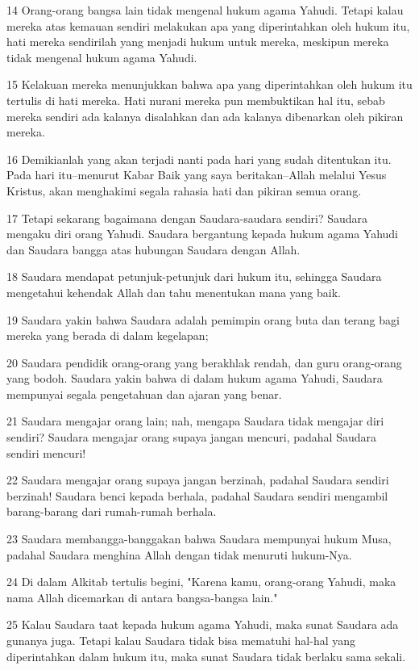 \par 14 Orang-orang bangsa lain tidak mengenal hukum agama Yahudi. Tetapi kalau mereka atas kemauan sendiri melakukan apa yang diperintahkan oleh hukum itu, hati mereka sendirilah yang menjadi hukum untuk mereka, meskipun mereka tidak mengenal hukum agama Yahudi.
\par 15 Kelakuan mereka menunjukkan bahwa apa yang diperintahkan oleh hukum itu tertulis di hati mereka. Hati nurani mereka pun membuktikan hal itu, sebab mereka sendiri ada kalanya disalahkan dan ada kalanya dibenarkan oleh pikiran mereka.
\par 16 Demikianlah yang akan terjadi nanti pada hari yang sudah ditentukan itu. Pada hari itu--menurut Kabar Baik yang saya beritakan--Allah melalui Yesus Kristus, akan menghakimi segala rahasia hati dan pikiran semua orang.
\par 17 Tetapi sekarang bagaimana dengan Saudara-saudara sendiri? Saudara mengaku diri orang Yahudi. Saudara bergantung kepada hukum agama Yahudi dan Saudara bangga atas hubungan Saudara dengan Allah.
\par 18 Saudara mendapat petunjuk-petunjuk dari hukum itu, sehingga Saudara mengetahui kehendak Allah dan tahu menentukan mana yang baik.
\par 19 Saudara yakin bahwa Saudara adalah pemimpin orang buta dan terang bagi mereka yang berada di dalam kegelapan;
\par 20 Saudara pendidik orang-orang yang berakhlak rendah, dan guru orang-orang yang bodoh. Saudara yakin bahwa di dalam hukum agama Yahudi, Saudara mempunyai segala pengetahuan dan ajaran yang benar.
\par 21 Saudara mengajar orang lain; nah, mengapa Saudara tidak mengajar diri sendiri? Saudara mengajar orang supaya jangan mencuri, padahal Saudara sendiri mencuri!
\par 22 Saudara mengajar orang supaya jangan berzinah, padahal Saudara sendiri berzinah! Saudara benci kepada berhala, padahal Saudara sendiri mengambil barang-barang dari rumah-rumah berhala.
\par 23 Saudara membangga-banggakan bahwa Saudara mempunyai hukum Musa, padahal Saudara menghina Allah dengan tidak menuruti hukum-Nya.
\par 24 Di dalam Alkitab tertulis begini, "Karena kamu, orang-orang Yahudi, maka nama Allah dicemarkan di antara bangsa-bangsa lain."
\par 25 Kalau Saudara taat kepada hukum agama Yahudi, maka sunat Saudara ada gunanya juga. Tetapi kalau Saudara tidak bisa mematuhi hal-hal yang diperintahkan dalam hukum itu, maka sunat Saudara tidak berlaku sama sekali.
